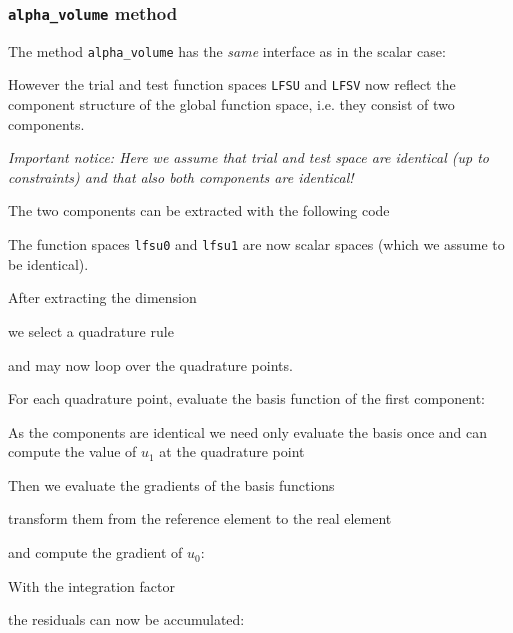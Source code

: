 \documentclass[a4paper,12pt]{article}
\begin{document}
\subsubsection*{\lstinline{alpha_volume} method}

The method \lstinline{alpha_volume} has the \textit{same} interface
as in the scalar case:

However the trial and test function spaces \lstinline{LFSU} and \lstinline{LFSV}
now reflect the component structure of the global function space, i.e.
they consist of two components.

\textit{Important notice: Here we assume that trial and test space are identical
(up to constraints) and that also both components are identical!}

The two components can be extracted with the following code

The function spaces \lstinline{lfsu0} and \lstinline{lfsu1} are
now scalar spaces (which we assume to be identical).

After extracting the dimension

we select a quadrature rule

and may now loop over the quadrature points.

For each quadrature point, evaluate the basis function
of the first component:

As the components are identical we need only evaluate the basis once
and can compute the value of $u_1$ at the quadrature point

Then we evaluate the gradients of the basis functions

transform them from the reference element to the real element

and compute the gradient of $u_0$:

With the integration factor

the residuals can now be accumulated:

\end{document}
